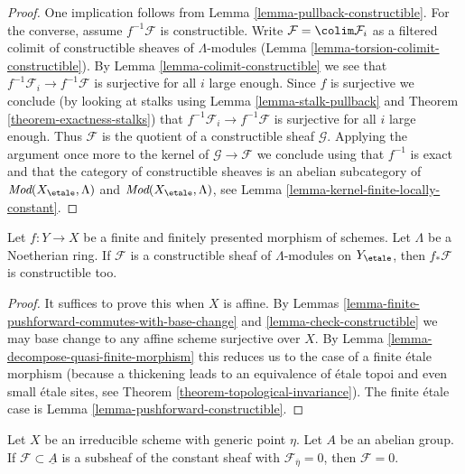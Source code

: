 \begin{proof}
One implication follows from Lemma \ref{lemma-pullback-constructible}.
For the converse, assume $f^{-1}\mathcal{F}$ is constructible.
Write $\mathcal{F} = \colim \mathcal{F}_i$ as a
filtered colimit of constructible sheaves of $\Lambda$-modules
(Lemma \ref{lemma-torsion-colimit-constructible}).
By Lemma \ref{lemma-colimit-constructible} we see that
$f^{-1}\mathcal{F}_i \to f^{-1}\mathcal{F}$
is surjective for all $i$ large enough. Since $f$ is surjective
we conclude (by looking at stalks using
Lemma \ref{lemma-stalk-pullback} and
Theorem \ref{theorem-exactness-stalks})
that $f^{-1}\mathcal{F}_i \to f^{-1}\mathcal{F}$
is surjective for all $i$ large enough.
Thus $\mathcal{F}$ is the quotient of a constructible sheaf $\mathcal{G}$.
Applying the argument once more to the kernel
of $\mathcal{G} \to \mathcal{F}$ we conclude using that $f^{-1}$ is exact
and that the category of constructible sheaves is an abelian
subcategory of $\textit{Mod}(X_\etale, \Lambda)$ and
$\textit{Mod}(X_\etale, \Lambda)$, see
Lemma \ref{lemma-kernel-finite-locally-constant}.
\end{proof}

\begin{lemma}
\label{lemma-finite-pushforward-constructible}
Let $f : Y \to X$ be a finite and finitely presented morphism
of schemes. Let $\Lambda$ be a Noetherian ring. If $\mathcal{F}$ is
a constructible sheaf of $\Lambda$-modules on $Y_\etale$,
then $f_*\mathcal{F}$ is constructible too.
\end{lemma}

\begin{proof}
It suffices to prove this when $X$ is affine.
By Lemmas \ref{lemma-finite-pushforward-commutes-with-base-change} and
\ref{lemma-check-constructible} we may base change to any
affine scheme surjective over $X$. By
Lemma \ref{lemma-decompose-quasi-finite-morphism}
this reduces us to the case of a finite \'etale morphism
(because a thickening leads to an equivalence of \'etale topoi
and even small \'etale sites, see
Theorem \ref{theorem-topological-invariance}).
The finite \'etale case is
Lemma \ref{lemma-pushforward-constructible}.
\end{proof}

\begin{lemma}
\label{lemma-irreducible-subsheaf-constant-zero}
Let $X$ be an irreducible scheme with generic point $\eta$.
Let $A$ be an abelian group. If $\mathcal{F} \subset \underline{A}$
is a subsheaf of the constant sheaf with $\mathcal{F}_{\overline{\eta}} = 0$,
then $\mathcal{F} = 0$.
\end{lemma}

